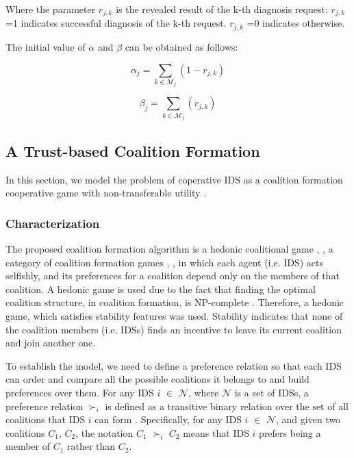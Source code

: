 \documentclass[conference]{IEEEtran}
\begin{document}
Where the parameter $r_{j,k}$ is the revealed result of the k-th diagnosis request: $r_{j,k}$ =1 indicates successful diagnosis of the k-th request. $r_{j,k}$ =0 indicates otherwise.

The initial value of $\alpha$ and $\beta$ can be obtained as follows:

\begin{equation}
\alpha_{j}=\sum_{k \in \mathcal{M}_{j}} (1 - r_{j,k})
\end{equation}

\begin{equation}
\beta_{j}=\sum_{k \in \mathcal{M}_{j}} (r_{j,k})
\end{equation}

\subsection{A Trust-based Coalition Formation}

In this section, we model the problem of coperative
IDS as a coalition formation cooperative game with
non-transferable utility \cite{bogomolnaia2002stability}.

\subsubsection{Characterization}

The proposed coalition formation algorithm is a hedonic coalitional game \cite{bogomolnaia2002stability}, \cite{dreze1980hedonic} \cite{wahab2016towards} \cite{wahab2017optimal}, a category of coalition formation
games \cite{ray2007game}, \cite{dreze1980hedonic}, \cite{apt2009generic} in which each agent (i.e. IDS)
acts selfishly, and its preferences for
a coalition depend only on the members of that coalition. A hedonic game is used due to the fact that finding the optimal coalition structure, in coalition formation, is NP-complete \cite{sandholm1999coalition}. Therefore, a hedonic game, which satisfies stability
features was used. Stability indicates that none of the coalition members (i.e. IDSs) finds an incentive to leave its current coalition and join another one.

To establish the model, we need to define a preference relation so that each
IDS can order and compare all the possible coalitions it
belongs to and build preferences over them. For any IDS $i$ $\in$ $\mathcal{N}$, where $\mathcal{N}$ is a set of
IDSs, a preference relation $\succ_{i}$ is defined as a transitive
binary relation over the set of all coalitions that IDS $i$ can
form \cite{bogomolnaia2002stability}. Specifically, for any IDS $i$ $\in$ $\mathcal{N}$, and given two coalitions $C_{1}$, $C_{2}$, the notation $C_{1}$ $\succ_{i}$ $C_{2}$ means that IDS $i$ prefers being a member of $C_{1}$ rather than $C_{2}$. \\
\end{document}
